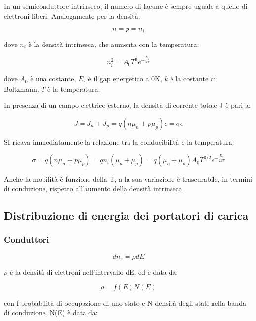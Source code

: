 \documentclass{article}
\begin{document}
In un semiconduttore intrinseco, il numero di lacune è sempre uguale a quello di elettroni liberi.
Analogamente per la densità:

\begin{equation}
    n = p = n_i
\end{equation}

dove $n_i$ è la densità intrinseca, che aumenta con la temperatura:

\begin{equation}
   n_i^2= A_0T^3 e^{-\frac{E_g}{kT}}
\end{equation}

dove $A_0$ è una costante, $E_g$ è il gap energetico a 0K, $k$ è la costante di Boltzmann, $T$ è la temperatura.

In presenza di un campo elettrico esterno, la densità di corrente totale J è pari a:

\begin{equation}
    J = J_n + J_p = q(n \mu_n + p \mu_p) \epsilon= \sigma \epsilon
\end{equation}

SI ricava immediatamente la relazione tra la conducibilità e la temperatura:

\begin{equation}
    \sigma= q(n \mu_n + p \mu_p)= qn_i(\mu_n + \mu_p)= q(\mu_n + \mu_p)A_0T^{3/2} e^{-\frac{E_g}{2kT}}
\end{equation}

Anche la mobilità è funzione della T, a la sua variazione è trascurabile, in termini di conduzione, rispetto all'aumento della densità intrinseca.

\subsection{Distribuzione di energia dei portatori di carica}
\subsubsection{Conduttori}
\begin{equation}
    d n_e= \rho dE
\end{equation}

$\rho$ è la densità di elettroni nell'intervallo dE, ed è data da:

\begin{equation}
    \rho = f(E) N(E)
\end{equation}

con f probabilità di occupazione di uno stato e N densità degli stati nella banda di conduzione.
N(E) è data da:
\end{document}

